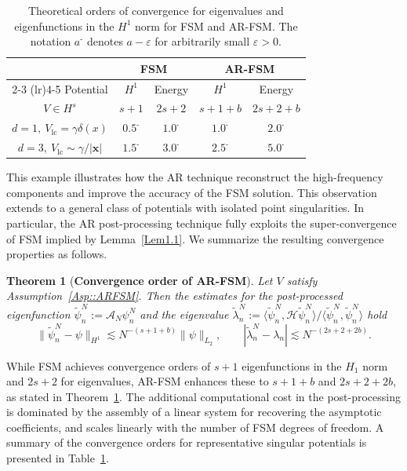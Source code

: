 \documentclass{sn-jnl}%
\newcommand{\m}{\textbf{-}}
\numberwithin{equation}{section}
\theoremstyle{thmstyleone}%
\newtheorem{theorem}{Theorem}%
\theoremstyle{thmstyletwo}%
\theoremstyle{thmstylethree}%
\begin{document}
\begin{table}[t]
\centering
\footnotesize
\caption{Theoretical orders of convergence for eigenvalues and eigenfunctions in the $H^1$ norm for FSM and AR-FSM. 
The notation $a^{\m}$ denotes $a-\varepsilon$ for arbitrarily small $\varepsilon>0$. 
}
\label{tab:01}
\begin{tabular}{c cc cc}
\toprule
& \multicolumn{2}{c}{FSM} & \multicolumn{2}{c}{AR-FSM} \\
\cmidrule(lr){2-3} \cmidrule(lr){4-5}
Potential  
& $H^1$ & Energy 
& $H^1$ & Energy \\
\midrule
$V\in H^{s}$ & $s+1$ & $2s+2$ & $s+1+b$ & $2s+2+b$ \\
\addlinespace
$d=1,\ V_{\mathrm{lc}}=\gamma\delta(x)$ & $0.5^{\m}$ & $1.0^{\m}$ & $1.0^{\m}$ & $2.0^{\m}$ \\
\addlinespace
$d=3,\ V_{\mathrm{lc}}\sim \gamma/|\bm x|$ & $1.5^{\m}$ & $3.0^{\m}$ & $2.5^{\m}$ & $5.0^{\m}$ \\
\bottomrule
\end{tabular}
\end{table}
This example illustrates how the AR technique reconstruct the high-frequency components and improve the accuracy of the FSM solution. 
This observation extends to a general class of potentials with isolated point singularities. 
In particular, the AR post-processing technique fully exploits the super-convergence of FSM implied by Lemma~\ref{Lem1.1}. 
We summarize the resulting convergence properties as follows.
\begin{theorem}[\bf Convergence order of AR-FSM]\label{Thm02}
  Let $V$ satisfy Assumption~\ref{Asp::ARFSM}. Then the estimates for the post-processed eigenfunction $\tilde{\psi}_n^N:=\mathcal{A}_N\psi^N_n$ and the eigenvalue $\tilde{\lambda}_n^N:=\langle\tilde{\psi}_n^N,\mathcal{H}\tilde{\psi}_n^N\rangle/\langle\tilde{\psi}_n^N,\tilde{\psi}_n^N\rangle$ hold
\begin{equation}
\|\tilde{\psi}_n^N - \psi\|_{H^1} \lesssim N^{-(s+1+b)}\|\psi\|_{L_2},\qquad |\tilde{\lambda}_n^N - \lambda_n| \lesssim N^{-(2s+2+2b)}.
\end{equation}
\end{theorem}

While FSM achieves convergence orders of $s+1$  
eigenfunctions in the $H_1$ norm and $2s+2$ for eigenvalues, AR-FSM enhances these to $s+1+b$ and $2s+2+2b$, as stated in Theorem~\ref{Thm02}. The additional computational cost in the post-processing is dominated by the assembly of a linear system for recovering the asymptotic coefficients, and scales linearly with the number of FSM degrees of freedom.
A summary of the convergence orders for representative singular potentials is presented in Table~\ref{tab:01}.
\end{document}
